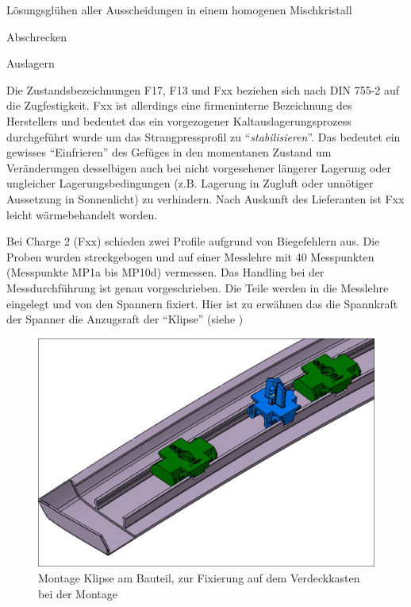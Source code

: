 \documentclass[12pt,a4paper,parskip,twoside,BCOR5mm,headsepline]{scrartcl}
\begin{document}
\begin{enumerate*}
 \item Lösungsglühen aller Ausscheidungen in einem homogenen Mischkristall 
 \item Abschrecken
 \item Auslagern 
 \end{enumerate*}
 
   
 
 

Die Zustandsbezeichnungen F17, F13 und Fxx beziehen sich nach DIN 755-2 auf die Zugfestigkeit. Fxx ist allerdings eine firmeninterne Bezeichnung des Herstellers und bedeutet das ein  vorgezogener Kaltauslagerungsprozess durchgeführt wurde um das Strangpressprofil zu "`\emph{stabilisieren}"'. Das bedeutet ein gewisses "`Einfrieren"' des Gefüges in den momentanen Zustand um Veränderungen desselbigen auch bei nicht vorgesehener längerer Lagerung oder ungleicher Lagerungsbedingungen (z.B. Lagerung in Zugluft oder unnötiger Aussetzung in Sonnenlicht) zu verhindern. Nach Auskunft des Lieferanten ist Fxx leicht wärmebehandelt worden.


 Bei Charge 2 (Fxx) schieden zwei Profile aufgrund von Biegefehlern aus. Die Proben wurden streckgebogen und auf einer Messlehre  mit 40 Messpunkten (Messpunkte MP1a bis MP10d) vermessen. Das Handling bei der Messdurchführung ist genau vorgeschrieben. Die Teile werden in die Messlehre eingelegt und von den Spannern fixiert. Hier ist zu erwähnen das die Spannkraft der Spanner die Anzugsraft der "`Klipse"' (siehe )
 \begin{figure}[H]
 \centering
 \includegraphics[width=.7\textwidth]{klip}
 \caption{Montage Klipse am Bauteil, zur Fixierung auf dem Verdeckkasten bei der Montage}
 \label{fig:klip}
 \end{figure}
 
\end{document}
